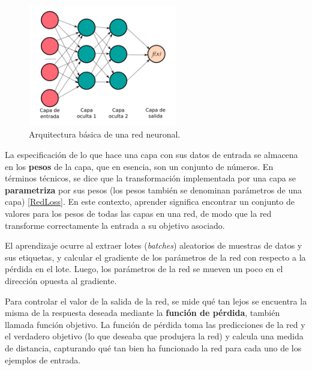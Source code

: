  \begin{figure}[!h]
 	\centering
 	
 	\includegraphics[width=2.55in]{Graphics/redNeuronal.png}
 	
 	\caption{ \small{Arquitectura básica de una red neuronal.}}
 	
 	\label{RedNeuronal}
 	
 \end{figure}


La especificación de lo que hace una capa con sus datos de entrada se almacena en los \textbf{pesos} de la capa, que en esencia, son un conjunto de números. En términos técnicos, se dice que la transformación implementada por una capa se \textbf{parametriza} por sus pesos (los pesos también se denominan parámetros de una capa) \ref{RedLoss}. En este contexto, aprender significa encontrar un conjunto de valores para los pesos de todas las capas en una red, de modo que la red transforme correctamente la entrada a su objetivo asociado.

El aprendizaje ocurre al extraer lotes (\textit{batches}) aleatorios de muestras de datos y sus
etiquetas, y calcular el gradiente de los parámetros de la red con respecto a la pérdida en el lote. Luego, los parámetros de la red se mueven un poco en el
dirección opuesta al gradiente.

Para controlar el valor de la salida de la red, se mide qué tan lejos se encuentra la misma de la respuesta deseada mediante la \textbf{función de pérdida}, también llamada función objetivo. La función de pérdida toma las predicciones de la red y el verdadero objetivo (lo que deseaba que produjera la red) y calcula una medida de distancia, capturando qué tan bien ha funcionado la red para cada uno de los ejemplos de entrada. 

